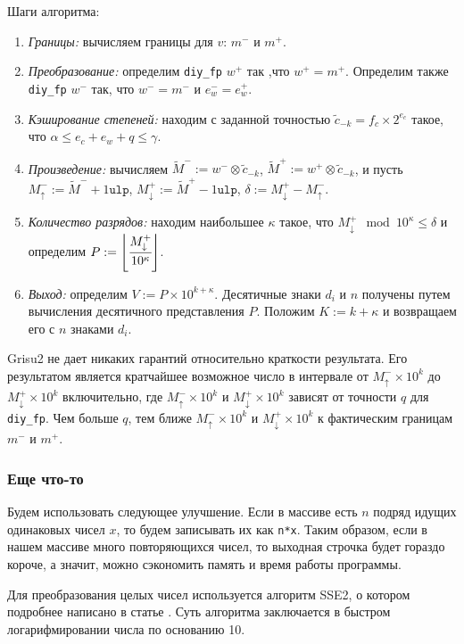 \documentclass[a4paper, 12pt, twoside]{article}
\begin{document}
Шаги алгоритма:
\begin{enumerate}
\item \textit{Границы:} вычисляем границы для $v$: $m^{-}$ и $m^{+}$. 
\item \textit{Преобразование:} определим \texttt{diy\_fp} $w^+$ так ,что $w^+ = m^+$. 
Определим также \texttt{diy\_fp} $w^-$ так, что $w^{-} = m^-$ и $e_w^- = e_w^+$.
\item \textit{Кэширование степеней:} находим с заданной точностью $\tilde{c}_{-k} = f_c \times 2^{e_c}$ такое, что $\alpha \leqslant e_c + e_w + q \leqslant \gamma$.
\item \textit{Произведение:} вычисляем $\tilde{M}^- := w^- \otimes \tilde{c}_{-k}$, $\tilde{M}^+ := w^+ \otimes \tilde{c}_{-k}$, и пусть $M_\uparrow^- := \tilde{M}^- + 1 \texttt{ulp}$, $M_\downarrow^+ := \tilde{M}^+ - 1 \texttt{ulp}$, $\delta := M_\downarrow^+ - M_\uparrow^-$.
\item \textit{Количество разрядов:} находим наибольшее $\kappa$ такое, что $M_\downarrow^+ \mod 10^\kappa \leqslant \delta$ и определим $P:= \left\lfloor \cfrac{M_\downarrow^+}{10^\kappa} \right\rfloor$.
\item \textit{Выход:} определим $V:= P \times 10^{k + \kappa}$. 
Десятичные знаки $d_i$ и $n$ получены путем вычисления десятичного представления $P$.
Положим $K:=k+\kappa$ и возвращаем его с $n$ знаками $d_i$.
\end{enumerate}

\textsf{Grisu2} не дает никаких гарантий относительно краткости результата. 
Его результатом является кратчайшее возможное число в интервале от $M_\uparrow^- \times 10^k$ до $M_\downarrow^+ \times 10^k$ включительно, где $M_\uparrow^- \times 10^k$ и $M_\downarrow^+ \times 10^k$  зависят от точности $q$ для \texttt{diy\_fp}.
Чем больше $q$, тем ближе $M_\uparrow^- \times 10^k$ и $M_\downarrow^+ \times 10^k$ к фактическим границам $m^-$ и $m^+$. 

\subsubsection{Еще что-то}
Будем использовать следующее улучшение.
Если в массиве есть $n$ подряд идущих одинаковых чисел $x$, то будем записывать их как \texttt{n*x}.
Таким образом, если в нашем массиве много повторяющихся чисел, то выходная строчка будет гораздо короче, а значит, можно сэкономить память и время работы программы.

Для преобразования целых чисел используется алгоритм \textsf{SSE2}, о котором подробнее написано в статье \cite{2}.
Суть алгоритма заключается в быстром логарифмировании числа по основанию 10.
\end{document}
